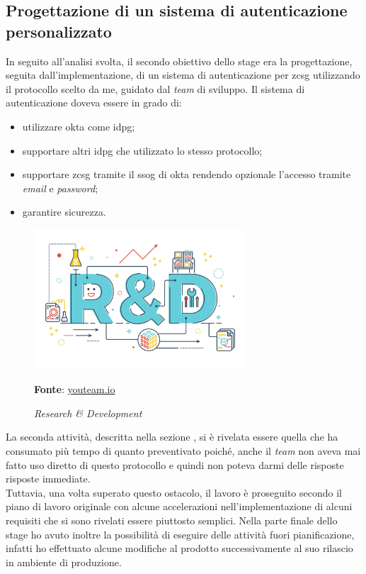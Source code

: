     \subsection{Progettazione di un sistema di autenticazione personalizzato} \label{sec:att_progett}
        In seguito all'analisi svolta, il secondo obiettivo dello stage era la progettazione, seguita dall'implementazione, di un sistema di autenticazione per \gls{zcsg} utilizzando il protocollo scelto da me, guidato dal \textit{team} di sviluppo. Il sistema di autenticazione doveva essere in grado di:
        \begin{itemize}
            \setlength\itemsep{0em}
            \item utilizzare \gls{okta} come \gls{idpg};
            \item supportare altri \gls{idpg} che utilizzato lo stesso protocollo;
            \item supportare \gls{zcsg} tramite il \gls{ssog} di \gls{okta} rendendo opzionale l'accesso tramite \textit{email} e \textit{password};
            \item garantire sicurezza.
        \end{itemize}
    \begin{figure}[ht]
        \centering
        \includegraphics[width=0.7\textwidth]{immagini/rd.jpg}
        \caption{\textit{Research \& Development}}
        \textbf{Fonte}:
        \href{https://youteam.io/blog/research-and-development-the-fourth-pillar-of-software-development/}{youteam.io}
        \label{fig: Research & Development}
    \end{figure}

\newpage

La seconda attività, descritta nella sezione , si è rivelata essere quella che ha consumato più tempo di quanto preventivato poiché, anche il \textit{team} non aveva mai fatto uso diretto di questo protocollo e quindi non poteva darmi delle risposte risposte immediate.\\
Tuttavia, una volta superato questo ostacolo, il lavoro è proseguito secondo il piano di lavoro originale con alcune accelerazioni nell'implementazione di alcuni requisiti che si sono rivelati essere piuttosto semplici. Nella parte finale dello stage ho avuto inoltre la possibilità di eseguire delle attività fuori pianificazione, infatti ho effettuato alcune modifiche al prodotto successivamente al suo rilascio in ambiente di produzione.


